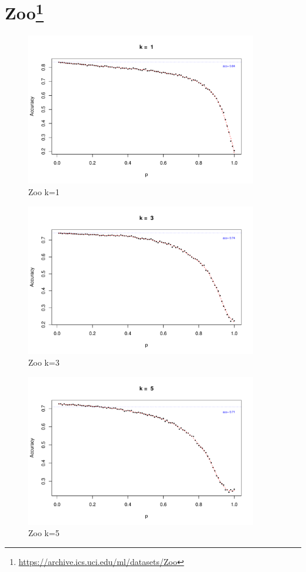 \documentclass{article}
\begin{document}
\FloatBarrier
\section[Zoo]{Zoo\footnote{\url{https://archive.ics.uci.edu/ml/datasets/Zoo}}}

\begin{figure}[h!]
 \centering
 \includegraphics[width=0.9\textwidth]{./figures/Zoo_k1.pdf}
 \caption{Zoo k=1}
 \label{fig:Zoo1}
\end{figure}
\begin{figure}[h!]
 \centering
 \includegraphics[width=0.9\textwidth]{./figures/Zoo_k3.pdf}
 \caption{Zoo k=3}
 \label{fig:Zoo3}
\end{figure}
\begin{figure}
 \centering
 \includegraphics[width=0.9\textwidth]{./figures/Zoo_k5.pdf}
 \caption{Zoo k=5}
 \label{fig:Zoo5}
\end{figure}
\end{document}
